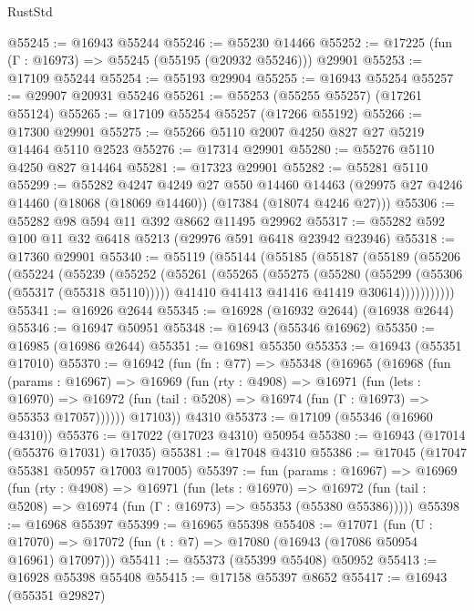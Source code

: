 \begin{lexlean}{RustStd}
\begin{coremodule}
@55245 := @16943 @55244
@55246 := @55230 @14466
@55252 := @17225 (fun (Γ : @16973) => @55245 (@55195 (@20932 @55246))) @29901
@55253 := @17109 @55244
@55254 := @55193 @29904
@55255 := @16943 @55254
@55257 := @29907 @20931 @55246
@55261 := @55253 (@55255 @55257) (@17261 @55124)
@55265 := @17109 @55254 @55257 (@17266 @55192)
@55266 := @17300 @29901
@55275 := @55266 @5110 @2007 @4250 @827 @27 @5219 @14464 @5110 @2523
@55276 := @17314 @29901
@55280 := @55276 @5110 @4250 @827 @14464
@55281 := @17323 @29901
@55282 := @55281 @5110
@55299 := @55282
    @4247
    @4249
    @27
    @550
    @14460
    @14463
    (@29975 @27 @4246 @14460 (@18068 (@18069 @14460)) (@17384 (@18074 @4246 @27)))
@55306 := @55282 @98 @594 @11 @392 @8662 @11495 @29962
@55317 := @55282 @592 @100 @11 @32 @6418 @5213 (@29976 @591 @6418 @23942 @23946)
@55318 := @17360 @29901
@55340 := @55119
    (@55144
      (@55185
        (@55187
          (@55189
            (@55206
              (@55224
                (@55239
                  (@55252
                    (@55261
                      (@55265
                        (@55275
                          (@55280 (@55299 (@55306 (@55317 (@55318 @5110)))))
                          @41410
                          @41413
                          @41416
                          @41419
                          @30614)))))))))))
@55341 := @16926 @2644
@55345 := @16928 (@16932 @2644) (@16938 @2644)
@55346 := @16947 @50951
@55348 := @16943 (@55346 @16962)
@55350 := @16985 (@16986 @2644)
@55351 := @16981 @55350
@55353 := @16943 (@55351 @17010)
@55370 := @16942
    (fun (fn : @77) =>
    @55348
      (@16965
        (@16968
          (fun (params : @16967) =>
          @16969
            (fun (rty : @4908) =>
            @16971
              (fun (lets : @16970) =>
              @16972 (fun (tail : @5208) => @16974 (fun (Γ : @16973) => @55353 @17057))))))
        @17103))
    @4310
@55373 := @17109 (@55346 (@16960 @4310))
@55376 := @17022 (@17023 @4310) @50954
@55380 := @16943 (@17014 (@55376 @17031) @17035)
@55381 := @17048 @4310
@55386 := @17045 (@17047 @55381 @50957 @17003 @17005)
@55397 := fun (params : @16967) =>
  @16969
    (fun (rty : @4908) =>
    @16971
      (fun (lets : @16970) =>
      @16972 (fun (tail : @5208) => @16974 (fun (Γ : @16973) => @55353 (@55380 @55386)))))
@55398 := @16968 @55397
@55399 := @16965 @55398
@55408 := @17071
    (fun (U : @17070) => @17072 (fun (t : @7) => @17080 (@16943 (@17086 @50954 @16961) @17097)))
@55411 := @55373 (@55399 @55408) @50952
@55413 := @16928 @55398 @55408
@55415 := @17158 @55397 @8652
@55417 := @16943 (@55351 @29827)

\end{coremodule}
\end{lexlean}
